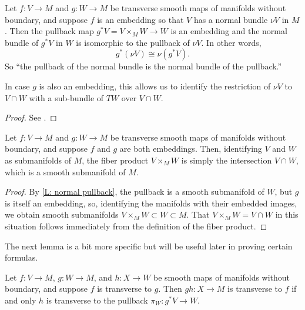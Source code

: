 \begin{lemma}\label{L: normal pullback}
	Let $f \colon V\to M$ and $g \colon W\to M$ be transverse smooth maps of manifolds without boundary, and suppose $f$ is an embedding so that $V$ has a normal bundle $\nu V$ in $M$.
	Then the pullback map $g^*V=V\times_MW\to W$ is an embedding and the normal bundle of $g^*V$ in $W$ is isomorphic to the pullback of $\nu V$.
	In other words,
	$$g^*(\nu V)\cong \nu(g^*V).$$
	So ``the pullback of the normal bundle is the normal bundle of the pullback.''

	In case $g$ is also an embedding, this allows us to identify the restriction of $\nu V$ to $V\cap W$ with a sub-bundle of $TW$ over $V\cap W$.
\end{lemma}

\begin{proof}
	See \cite[Proposition IV.1.4]{Kos93}.
\end{proof}

\begin{lemma}
	Let $f \colon V\to M$ and $g \colon W\to M$ be transverse smooth maps of manifolds without boundary, and suppose $f$ and $g$ are both embeddings.
	Then, identifying $V$ and $W$ as submanifolds of $M$, the fiber product $V\times_MW$ is simply the intersection $V\cap W$, which is a smooth submanifold of $M$.
\end{lemma}

\begin{proof}
	By \cref{L: normal pullback}, the pullback is a smooth submanifold of $W$, but $g$ is itself an embedding, so, identifying the manifolds with their embedded images, we obtain smooth submanifolds $V\times_MW\subset W\subset M$.
	That $V\times_MW=V\cap W$ in this situation follows immediately from the definition of the fiber product.
\end{proof}

The next lemma is a bit more specific but will be useful later in proving certain formulas.

\begin{lemma}\label{L: transverse to pullback}
	Let $f \colon V\to M$, $g \colon W\to M$, and $h \colon X\to W$ be smooth maps of manifolds without boundary, and suppose $f$ is transverse to $g$.
	Then $gh \colon X\to M$ is transverse to $f$ if and only $h$ is transverse to the pullback $\pi_W \colon g^*V\to W$.
\end{lemma}

